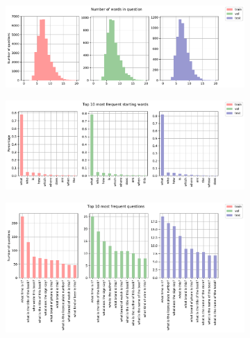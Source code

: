     
\begin{figure}[h]
  \centering
  \begin{subfigure}[b]{0.8\textwidth}
    \includegraphics[width=\textwidth]{figures/qlength.pdf}
    \caption{}
    \label{subfig:qlength}
  \end{subfigure}
  
   \begin{subfigure}[b]{0.8\textwidth}
    \includegraphics[width=\textwidth]{figures/top10start.pdf}
    \caption{}
    \label{subfig:top10start}
  \end{subfigure}
  
  \begin{subfigure}[b]{0.8\textwidth}
    \includegraphics[width=\textwidth]{figures/top10q.pdf}
    \caption{}
    \label{subfig:top10q}
  \end{subfigure}
  

\end{figure}
